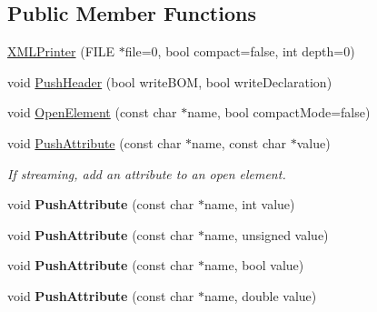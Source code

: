 \subsection*{Public Member Functions}
\begin{DoxyCompactItemize}
\item 
\hyperlink{classtinyxml2_1_1_x_m_l_printer_aa6d3841c069085f5b8a27bc7103c04f7}{X\+M\+L\+Printer} (F\+I\+LE $\ast$file=0, bool compact=false, int depth=0)
\item 
void \hyperlink{classtinyxml2_1_1_x_m_l_printer_a178c608ce8476043d5d6513819cde903}{Push\+Header} (bool write\+B\+OM, bool write\+Declaration)
\item 
void \hyperlink{classtinyxml2_1_1_x_m_l_printer_a20fb06c83bd13e5140d7dd13af06c010}{Open\+Element} (const char $\ast$name, bool compact\+Mode=false)
\item 
void \hyperlink{classtinyxml2_1_1_x_m_l_printer_a9a4e2c9348b42e147629d5a99f4af3f0}{Push\+Attribute} (const char $\ast$name, const char $\ast$value)\hypertarget{classtinyxml2_1_1_x_m_l_printer_a9a4e2c9348b42e147629d5a99f4af3f0}{}\label{classtinyxml2_1_1_x_m_l_printer_a9a4e2c9348b42e147629d5a99f4af3f0}

\begin{DoxyCompactList}\small\item\em If streaming, add an attribute to an open element. \end{DoxyCompactList}\item 
void {\bfseries Push\+Attribute} (const char $\ast$name, int value)\hypertarget{classtinyxml2_1_1_x_m_l_printer_a69120c82088597372d28d0a98f2ee7a1}{}\label{classtinyxml2_1_1_x_m_l_printer_a69120c82088597372d28d0a98f2ee7a1}

\item 
void {\bfseries Push\+Attribute} (const char $\ast$name, unsigned value)\hypertarget{classtinyxml2_1_1_x_m_l_printer_aa41039e51990aaf5342f3e0575a692c4}{}\label{classtinyxml2_1_1_x_m_l_printer_aa41039e51990aaf5342f3e0575a692c4}

\item 
void {\bfseries Push\+Attribute} (const char $\ast$name, bool value)\hypertarget{classtinyxml2_1_1_x_m_l_printer_a51f7950d7b7a19f0d3a0d549a318d45f}{}\label{classtinyxml2_1_1_x_m_l_printer_a51f7950d7b7a19f0d3a0d549a318d45f}

\item 
void {\bfseries Push\+Attribute} (const char $\ast$name, double value)\hypertarget{classtinyxml2_1_1_x_m_l_printer_a1714867af40e68ca404c3e84b6cac2a6}{}\label{classtinyxml2_1_1_x_m_l_printer_a1714867af40e68ca404c3e84b6cac2a6}


\end{DoxyCompactItemize}
